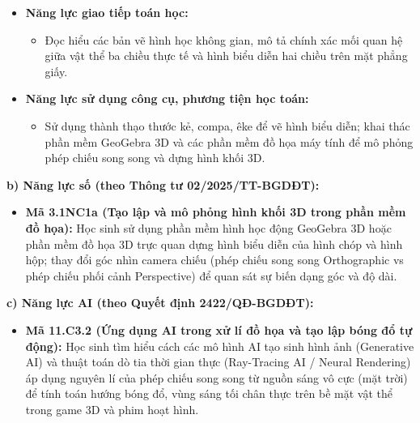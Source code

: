 \documentclass[12pt, a4paper]{article}
\begin{document}
\begin{itemize}[leftmargin=1.5em]
\begin{itemize}
        \item Sử dụng được kiến thức về phép chiếu song song để giải thích các hiện tượng quang học thực tế: bóng của cây cối, cột cờ, tòa nhà dưới ánh sáng mặt trời (các tia sáng mặt trời xem như song song); ứng dụng trong vẽ phối cảnh kĩ thuật và kiến trúc.
    \end{itemize}
    \item \textbf{Năng lực giao tiếp toán học:}
    \begin{itemize}
        \item Đọc hiểu các bản vẽ hình học không gian, mô tả chính xác mối quan hệ giữa vật thể ba chiều thực tế và hình biểu diễn hai chiều trên mặt phẳng giấy.
    \end{itemize}
    \item \textbf{Năng lực sử dụng công cụ, phương tiện học toán:}
    \begin{itemize}
        \item Sử dụng thành thạo thước kẻ, compa, êke để vẽ hình biểu diễn; khai thác phần mềm GeoGebra 3D và các phần mềm đồ họa máy tính để mô phỏng phép chiếu song song và dựng hình khối 3D.
    \end{itemize}
\end{itemize}

\textbf{b) Năng lực số (theo Thông tư 02/2025/TT-BGDĐT):}
\begin{itemize}[leftmargin=1.5em]
    \item \textbf{Mã 3.1NC1a (Tạo lập và mô phỏng hình khối 3D trong phần mềm đồ họa):} Học sinh sử dụng phần mềm hình học động GeoGebra 3D hoặc phần mềm đồ họa 3D trực quan dựng hình biểu diễn của hình chóp và hình hộp; thay đổi góc nhìn camera chiếu (phép chiếu song song Orthographic vs phép chiếu phối cảnh Perspective) để quan sát sự biến dạng góc và độ dài.
\end{itemize}

\textbf{c) Năng lực AI (theo Quyết định 2422/QĐ-BGDĐT):}
\begin{itemize}[leftmargin=1.5em]
    \item \textbf{Mã 11.C3.2 (Ứng dụng AI trong xử lí đồ họa và tạo lập bóng đổ tự động):} Học sinh tìm hiểu cách các mô hình AI tạo sinh hình ảnh (Generative AI) và thuật toán dò tia thời gian thực (Ray-Tracing AI / Neural Rendering) áp dụng nguyên lí của phép chiếu song song từ nguồn sáng vô cực (mặt trời) để tính toán hướng bóng đổ, vùng sáng tối chân thực trên bề mặt vật thể trong game 3D và phim hoạt hình.
\end{itemize}
\end{document}
